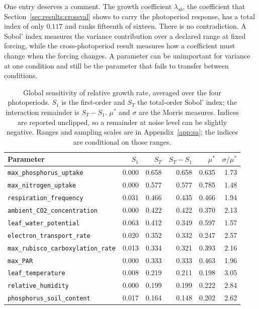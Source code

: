 One entry deserves a comment. The growth coefficient $\lambda_{sb}$, the
coefficient that Section~\ref{sec:results:crossval} shows to carry the
photoperiod response, has a total index of only $0.117$ and ranks fifteenth of
sixteen. There is no contradiction. A Sobol' index measures the variance
contribution over a declared range at fixed forcing, while the
cross-photoperiod result measures how a coefficient must change when the
forcing changes. A parameter can be unimportant for variance at one condition
and still be the parameter that fails to transfer between conditions.

\begin{table}[!htbp]
\centering
\caption{Global sensitivity of relative growth rate, averaged over the four
photoperiods. $S_1$ is the first-order and $S_T$ the total-order Sobol' index;
the interaction remainder is $S_T - S_1$. $\mu^{*}$ and $\sigma$ are the
Morris measures. Indices are reported unclipped, so a remainder at noise level
can be slightly negative. Ranges and sampling scales are in
Appendix~\ref{app:sa}; the indices are conditional on those ranges.}
\label{tab:sens}
\footnotesize
\begin{tabular}{@{}lrrrrr@{}}
\toprule
Parameter & $S_1$ & $S_T$ & $S_T-S_1$ & $\mu^{*}$ & $\sigma/\mu^{*}$ \\
\midrule
\texttt{max\_phosphorus\_uptake}   & 0.000 & 0.658 & 0.658 & 0.635 & 1.73 \\
\texttt{max\_nitrogen\_uptake}     & 0.000 & 0.577 & 0.577 & 0.785 & 1.48 \\
\texttt{respiration\_frequency}    & 0.031 & 0.466 & 0.435 & 0.466 & 1.94 \\
\texttt{ambient\_CO2\_concentration} & 0.000 & 0.422 & 0.422 & 0.370 & 2.13 \\
\texttt{leaf\_water\_potential}    & 0.063 & 0.412 & 0.349 & 0.597 & 1.57 \\
\texttt{electron\_transport\_rate} & 0.020 & 0.352 & 0.332 & 0.247 & 2.57 \\
\texttt{max\_rubisco\_carboxylation\_rate} & 0.013 & 0.334 & 0.321 & 0.393 & 2.16 \\
\texttt{max\_PAR}                  & 0.000 & 0.333 & 0.333 & 0.463 & 1.96 \\
\texttt{leaf\_temperature}         & 0.008 & 0.219 & 0.211 & 0.198 & 3.05 \\
\texttt{relative\_humidity}        & 0.000 & 0.199 & 0.199 & 0.222 & 2.84 \\
\texttt{phosphorus\_soil\_content} & 0.017 & 0.164 & 0.148 & 0.202 & 2.62 \\

\end{tabular}
\end{table}
